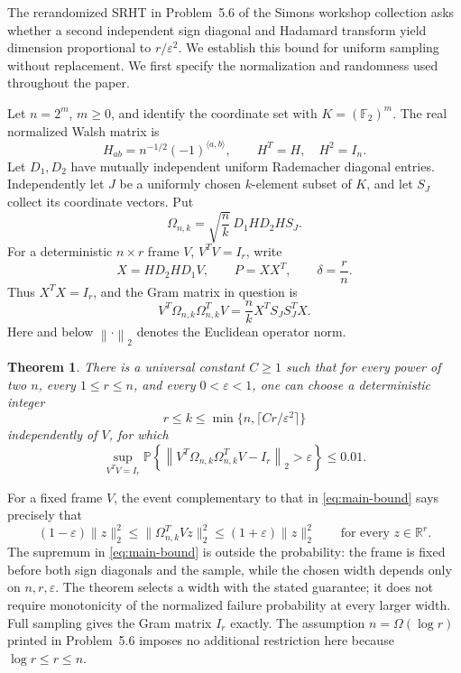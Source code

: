 \documentclass[11pt]{article}
\newtheorem{theorem}{Theorem}
\theoremstyle{definition}
\theoremstyle{remark}
\theoremstyle{plain}
\newcommand{\Prob}{\mathbb P}
\newcommand{\F}{\mathbb F}
\newcommand{\R}{\mathbb R}
\newcommand{\norm}[1]{\left\lVert#1\right\rVert_2}
\begin{document}
The rerandomized SRHT in Problem~5.6 of the Simons workshop collection
\cite[Definitions~5.1 and~5.3, Problem~5.6]{workshop} asks whether a
second independent sign diagonal and Hadamard transform yield
dimension proportional to $r/\varepsilon^2$. We establish this bound
for uniform sampling without replacement. We first specify the
normalization and randomness used throughout the paper.

Let \(n=2^m\), \(m\ge0\), and identify the coordinate set with
\(K=(\F_2)^m\). The real normalized Walsh matrix is
\[
 H_{ab}=n^{-1/2}(-1)^{\langle a,b\rangle},\qquad H^T=H,\quad H^2=I_n.
\]
Let \(D_1,D_2\) have mutually independent uniform Rademacher diagonal
entries. Independently let \(J\) be a uniformly chosen \(k\)-element
subset of \(K\), and let \(S_J\) collect its coordinate vectors. Put
\[
 \Omega_{n,k}=\sqrt{\frac nk}\,D_1HD_2HS_J.
\]
For a deterministic \(n\times r\) frame \(V\), \(V^TV=I_r\), write
\[
 X=HD_2HD_1V,\qquad P=XX^T,\qquad \delta=\frac rn.
\]
Thus \(X^TX=I_r\), and the Gram matrix in question is
\begin{equation}\label{eq:sampled-gram}
 V^T\Omega_{n,k}\Omega_{n,k}^TV
   =\frac nk X^T S_JS_J^T X.
\end{equation}
Here and below $\norm{\cdot}$ denotes the Euclidean operator norm.

\begin{theorem}\label{thm:main}
There is a universal constant \(C\ge1\) such that for every power of
two \(n\), every \(1\le r\le n\), and every \(0<\varepsilon<1\), one can
choose a deterministic integer
\[
 r\le k\le\min\{n,\lceil Cr/\varepsilon^2\rceil\}
\]
independently of \(V\), for which
\begin{equation}\label{eq:main-bound}
 \sup_{V^TV=I_r}
 \Prob\!\left\{\norm{V^T\Omega_{n,k}\Omega_{n,k}^TV-I_r}
                      >\varepsilon\right\}\le0.01.
\end{equation}
\end{theorem}

For a fixed frame $V$, the event complementary to that in
\eqref{eq:main-bound} says precisely that
\[
 (1-\varepsilon)\|z\|_2^2
 \le \|\Omega_{n,k}^T Vz\|_2^2
 \le (1+\varepsilon)\|z\|_2^2
 \qquad\text{for every }z\in\R^r.
\]
The supremum in \eqref{eq:main-bound} is outside the probability:
the frame is fixed before both sign diagonals and the sample, while
the chosen width depends only on $n,r,\varepsilon$. The theorem
selects a width with the stated guarantee; it does not require
monotonicity of the normalized failure probability at every larger
width. Full sampling gives the Gram matrix $I_r$ exactly.
The assumption $n=\Omega(\log r)$ printed in Problem~5.6 imposes no
additional restriction here because $\log r\le r\le n$.
\end{document}
